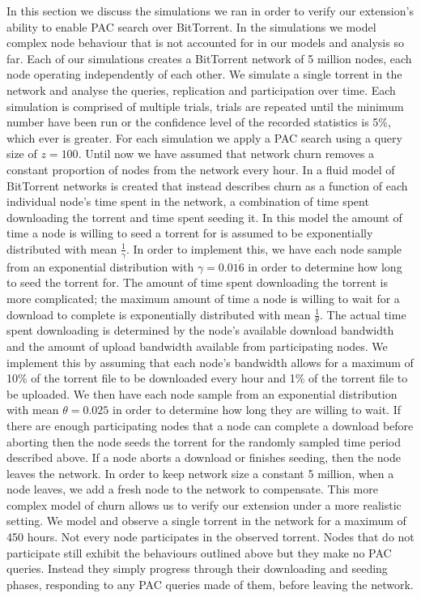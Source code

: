 In this section we discuss the simulations we ran in order to verify our extension's ability to enable PAC search over BitTorrent. In the simulations we model complex node behaviour that is not accounted for in our models and analysis so far. Each of our simulations creates a BitTorrent network of 5 million nodes, each node operating independently of each other. We simulate a single torrent in the network and analyse the queries, replication and participation over time. Each simulation is comprised of multiple trials, trials are repeated until the minimum number have been run or the confidence level of the recorded statistics is 5\%, which ever is greater. For each simulation we apply a PAC search using a query size of $z=100$. Until now we have assumed that network churn removes a constant proportion of nodes from the network every hour. In \cite{Qiu2004,Guo2007} a fluid model of BitTorrent networks is created that instead describes churn as a function of each individual node's time spent in the network, a combination of time spent downloading the torrent and time spent seeding it. In this model the amount of time a node is willing to seed a torrent for is assumed to be exponentially distributed with mean $\tfrac{1}{\gamma}$. In order to implement this, we have each node sample from an exponential distribution with $\gamma=0.01\dot{6}$ in order to determine how long to seed the torrent for. The amount of time spent downloading the torrent is more complicated; the maximum amount of time a node is willing to wait for a download to complete is exponentially distributed with mean $\tfrac{1}{\theta}$. The actual time spent downloading is determined by the node's available download bandwidth and the amount of upload bandwidth available from participating nodes. We implement this by assuming that each node's bandwidth allows for a maximum of 10\% of the torrent file to be downloaded every hour and 1\% of the torrent file to be uploaded. We then have each node sample from an exponential distribution with mean $\theta=0.025$ in order to determine how long they are willing to wait. If there are enough participating nodes that a node can complete a download before aborting then the node seeds the torrent for the randomly sampled time period described above. If a node aborts a download or finishes seeding, then the node leaves the network. In order to keep network size a constant 5 million, when a node leaves, we add a fresh node to the network to compensate. This more complex model of churn allows us to verify our extension under a more realistic setting. We model and observe a single torrent in the network for a maximum of 450 hours. Not every node participates in the observed torrent. Nodes that do not participate still exhibit the behaviours outlined above but they make no PAC queries. Instead they simply progress through their downloading and seeding phases, responding to any PAC queries made of them, before leaving the network.

